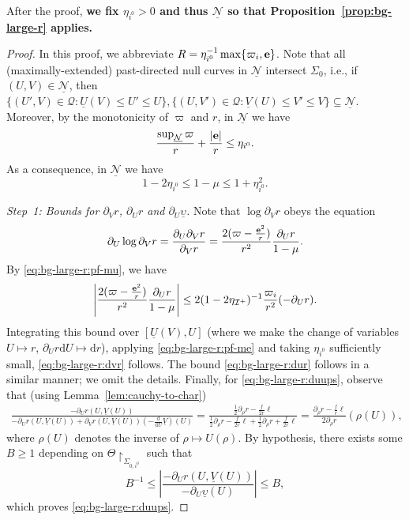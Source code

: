 \documentclass[10pt, reqno]{amsart}
\theoremstyle{definition}
\theoremstyle{remark}
\theoremstyle{conjecture}
\numberwithin{equation}{section}
\newcommand{\abs}[1]{\vert#1\vert}
\newcommand{\set}[1]{\{#1\}}
\newcommand{\ud}{\mathrm{d}}
\newcommand{\rd}{\partial}
\newcommand{\0}{\emptyset}
\newcommand{\Sgm}{\Sigma}
\newcommand{\Tht}{\Theta}
\newcommand{\ups}{\upsilon}
\newcommand{\bfe}{{\bf e}}
\newcommand{\calI}{\mathcal I}
\newcommand{\calN}{\mathcal N}
\newcommand{\calQ}{\mathcal Q}
\newcommand{\PD}{\calQ}
\newcommand{\pfstep}[1]{\vspace{.5em} {\it \noindent #1.}}
\newcommand{\e}{\bfe}							%
\newcommand{\NI}{\calI^{+}}						%
\newcommand{\Abs}[1]{\left\vert #1 \right\vert}
\begin{document}
After the proof, {\bf we fix $\eta_{i^{0}} > 0$ and thus $\underline{\calN}$ so that Proposition~\ref{prop:bg-large-r} applies.}


\begin{proof}
In this proof, we abbreviate $R = \eta_{i^{0}}^{-1} \max \set{\varpi_{i}, \e}$.
Note that all (maximally-extended) past-directed null curves in $\underline{\calN}$ intersect $\Sgm_{0}$, i.e., if $(U, V) \in \underline{\calN}$, then $\set{(U', V) \in \PD : \underline{U}(V) \leq U' \leq U}, \set{(U, V') \in \PD : \underline{V}(U) \leq V' \leq V} \subseteq \underline{\calN}$. Moreover, by the monotonicity of $\varpi$ and $r$, in $\underline{\calN}$ we have
\begin{equation} \label{eq:bg-large-r:pf-me}
	\frac{\sup_{\underline{\calN}} \varpi}{r} + \frac{\abs{\e}}{r} \leq \eta_{i^{0}}.
\end{equation}
As a consequence, in $\underline{\calN}$ we have
\begin{equation} \label{eq:bg-large-r:pf-mu} 
	1 - 2 \eta_{i^{0}}
	\leq
	1 - \mu 
	\leq 1 + \eta_{i^{0}}^{2} . 
\end{equation}

\pfstep{Step~1: Bounds for $\rd_{V} r$, $\rd_{U} r$ and $\rd_{U} \underline{\ups}$}
Note that $\log \rd_{V} r$ obeys the equation
\begin{equation*}
	\rd_{U} \log \rd_{V} r = \frac{\rd_{U} \rd_{V} r}{\rd_{V} r} = \frac{2 (\varpi - \frac{\e^{2}}{r})}{r^{2}} \frac{\rd_{U} r}{1-\mu}.
\end{equation*}
By \eqref{eq:bg-large-r:pf-mu}, we have
\begin{equation} \label{eq:bg-large-r:pf0}
	\Abs{\frac{2 (\varpi - \frac{\e^{2}}{r})}{r^{2}} \frac{\rd_{U} r}{1-\mu}}
	\leq 2 (1-2\eta_{\NI})^{-1} \frac{\varpi_{i}}{r^{2}} (-\rd_{U} r).
\end{equation}
Integrating this bound over $[\underline{U}(V), U]$ (where we make the change of variables $U \mapsto r$, $\rd_{U} r \ud U \mapsto \ud r$), applying \eqref{eq:bg-large-r:pf-me} and taking $\eta_{i^{0}}$ sufficiently small, \eqref{eq:bg-large-r:dvr} follows. The bound \eqref{eq:bg-large-r:dur} follows in a similar manner; we omit the details. Finally, for \eqref{eq:bg-large-r:duups}, observe that (using Lemma~\ref{lem:cauchy-to-char})
\begin{align*}
\frac{- \rd_{U} r(U, \underline{V}(U))}{-\rd_{U} r(U, \underline{V}(U)) + \rd_{V} r(U, \underline{V}(U)) (-\frac{\ud }{\ud U} \underline{V})(U)} 
= \frac{\frac{1}{2} \rd_{\rho} r - \frac{f}{2 r} \ell}{\frac{1}{2} \rd_{\rho} r - \frac{f}{2 r} \ell + \frac{1}{2} \rd_{\rho} r + \frac{f}{2 r} \ell} 
= \frac{\rd_{\rho} r - \frac{f}{r} \ell}{2 \rd_{\rho} r} (\rho(U)),
\end{align*}
where $\rho(U)$ denotes the inverse of $\rho \mapsto U(\rho)$. By hypothesis, there exists some $B \geq 1$ depending on $\Tht \restriction_{\Sgm_{0, i^{0}}}$ such that
\begin{equation} \label{eq:bg-large-r:pf:duups}
B^{-1} \leq \Abs{\frac{-\rd_{U} r(U, \underline{V}(U))}{-\rd_{U} \underline{\ups}(U)}} \leq B,
\end{equation}
which proves \eqref{eq:bg-large-r:duups}.



\end{proof}
\end{document}

